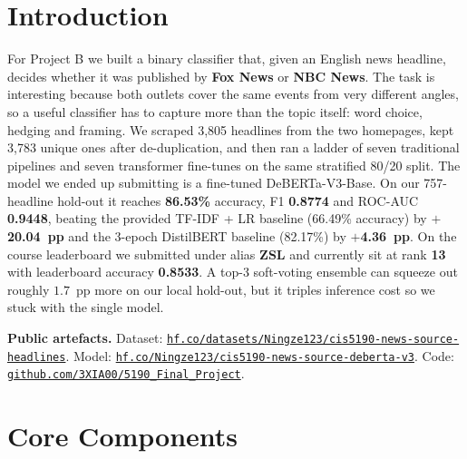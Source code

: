 \documentclass[10pt]{article}
\newcommand{\head}[4]{%
\thispagestyle{plain}%
\newpage
\setcounter{page}{1}%
\noindent
\begin{center}
\fbox{\begin{minipage}{6.28in}%
\vspace{2pt}%
{\small CIS 4190/5190: Applied Machine Learning \hfill #1}\par
\vspace{6pt}%
\begin{center}{\large\bfseries #2}\end{center}%
\vspace{2pt}%
{\itshape #3 \hfill #4}%
\vspace{2pt}%
\end{minipage}}%
\end{center}
}
\begin{document}
\head{Spring 2026}{Reading Between the Headlines: Detecting News Source Style with DeBERTa-V3}{Haoran Wu, Ningze Zhong, Yuzhou Shen \quad Group: 45}{Project B: News Source Classification}

\section{Introduction}
For Project B we built a binary classifier that, given an English news headline, decides whether it was published by \textbf{Fox News} or \textbf{NBC News}. The task is interesting because both outlets cover the same events from very different angles, so a useful classifier has to capture more than the topic itself: word choice, hedging and framing. We scraped 3{,}805 headlines from the two homepages, kept 3{,}783 unique ones after de-duplication, and then ran a ladder of seven traditional pipelines and seven transformer fine-tunes on the same stratified 80/20 split. The model we ended up submitting is a fine-tuned DeBERTa-V3-Base. On our 757-headline hold-out it reaches \textbf{86.53\%} accuracy, F1 \textbf{0.8774} and ROC-AUC \textbf{0.9448}, beating the provided TF-IDF + LR baseline (66.49\% accuracy) by \textbf{$+$20.04~pp} and the 3-epoch DistilBERT baseline (82.17\%) by \textbf{$+$4.36~pp}. On the course leaderboard we submitted under alias \textbf{ZSL} and currently sit at rank \textbf{13} with leaderboard accuracy \textbf{0.8533}. A top-3 soft-voting ensemble can squeeze out roughly $1.7$~pp more on our local hold-out, but it triples inference cost so we stuck with the single model.

\noindent\textbf{Public artefacts.}
Dataset: \href{https://huggingface.co/datasets/Ningze123/cis5190-news-source-headlines}{\texttt{hf.co/datasets/Ningze123/cis5190-news-source-headlines}}.\;
Model: \href{https://huggingface.co/Ningze123/cis5190-news-source-deberta-v3}{\texttt{hf.co/Ningze123/cis5190-news-source-deberta-v3}}.\;
Code: \href{https://github.com/3XIA00/5190_Final_Project}{\texttt{github.com/3XIA00/5190\_Final\_Project}}.

\section{Core Components}
\end{document}
